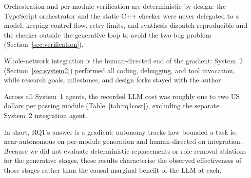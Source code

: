 Orchestration and per-module verification are deterministic by design: the TypeScript orchestrator and the static C++ checker were never delegated to a model, keeping control flow, retry limits, and synthesis dispatch reproducible and the checker outside the generative loop to avoid the two-bug problem (Section~\ref{sec:verification}).

Whole-network integration is the human-directed end of the gradient: System~2 (Section~\ref{sec:system2}) performed all coding, debugging, and tool invocation, while research goals, milestones, and design forks stayed with the author.

Across all System~1 agents, the recorded LLM cost was roughly one to two US dollars per passing module (Table~\ref{tab:rq1cost}), excluding the separate System~2 integration agent.

In short, RQ1's answer is a gradient: autonomy tracks how bounded a task is, near-autonomous on per-module generation and human-directed on integration. Because we did not evaluate deterministic replacements or role-removal ablations for the generative stages, these results characterise the observed effectiveness of those stages rather than the causal marginal benefit of the LLM at each.
